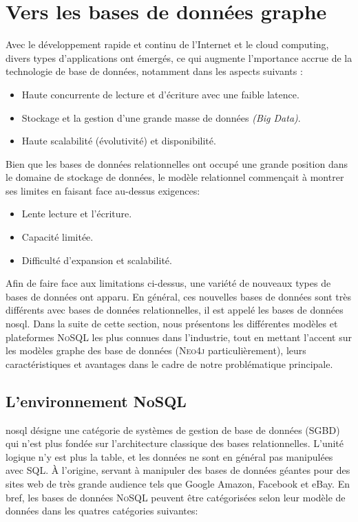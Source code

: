 \chapter{Vers les bases de données graphe}
\label{ch:graph-db}
Avec le développement rapide et continu de l'Internet et le cloud
computing, divers types d'applications ont émergés, ce qui augmente
l'mportance accrue de la technologie de base de données, notamment
dans les aspects suivants \cite{han2011survey}:

\begin{itemize} %
\item Haute concurrente de lecture et d'écriture avec une faible
  latence.
\item Stockage et la gestion d'une grande masse de données \emph{(Big
    Data)}.
\item Haute scalabilité (évolutivité) et disponibilité.
\end{itemize}

Bien que les bases de données relationnelles ont occupé une grande
position dans le domaine de stockage de données, le modèle relationnel
commençait à montrer ses limites en faisant face au-dessus exigences:

\begin{itemize} %
\item Lente lecture et l'écriture.
\item Capacité limitée.
\item Difficulté d'expansion et scalabilité.
\end{itemize}

Afin de faire face aux limitations ci-dessus, une variété de nouveaux
types de bases de données ont apparu. En général, ces nouvelles bases
de données sont très différents avec bases de données relationnelles,
il est appelé les bases de données \acrshort{nosql}. Dans la suite de
cette section, nous présentons les différentes modèles et plateformes
\textsc{NoSQL} les plus connues dans l'industrie, tout en mettant
l'accent sur les modèles graphe des base de données (\textsc{Neo4j}
particulièrement), leurs caractéristiques et avantages dans le cadre
de notre problématique principale.
\newpage
\section{L'environnement NoSQL}
\label{sec:nosql}
\acrshort{nosql} désigne une catégorie de systèmes de gestion de base
de données (\acrshort{SGBD}) qui n'est plus fondée sur l'architecture
classique des bases relationnelles. L'unité logique n'y est plus la
table, et les données ne sont en général pas manipulées avec
\textsc{SQL}. À l'origine, servant à manipuler des bases de données
géantes pour des sites web de très grande audience tels que Google
Amazon, Facebook et eBay. En bref, les bases de données \textsc{NoSQL}
peuvent être catégorisées selon leur modèle de données dans les
quatres catégories suivantes:

